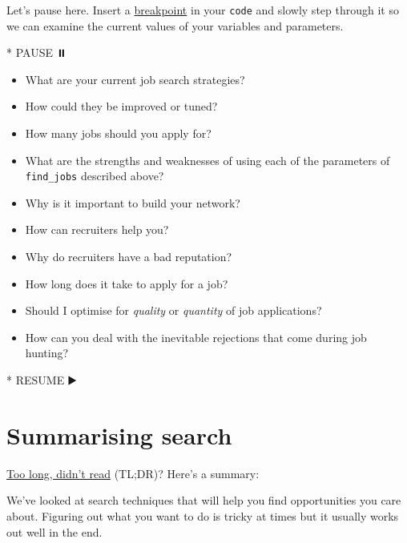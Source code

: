 \documentclass[
]{book}
\newenvironment{Shaded}{\begin{snugshade}}{\end{snugshade}}
\newcommand{\NormalTok}[1]{#1}
\newcommand{\SpecialStringTok}[1]{\textcolor[rgb]{0.31,0.60,0.02}{#1}}
\providecommand{\tightlist}{%
  \setlength{\itemsep}{0pt}\setlength{\parskip}{0pt}}
\begin{document}
Let's pause here. Insert a \href{https://en.wikipedia.org/wiki/Breakpoint}{breakpoint} in your \texttt{code} and slowly step through it so we can examine the current values of your variables and parameters.

\begin{Shaded}
\begin{Highlighting}[]
\SpecialStringTok{* }\NormalTok{PAUSE ⏸️}
\end{Highlighting}
\end{Shaded}

\begin{itemize}
\tightlist
\item
  What are your current job search strategies?
\item
  How could they be improved or tuned?
\item
  How many jobs should you apply for?\\
\item
  What are the strengths and weaknesses of using each of the parameters of \texttt{find\_jobs} described above?
\item
  Why is it important to build your network?
\item
  How can recruiters help you?
\item
  Why do recruiters have a bad reputation?
\item
  How long does it take to apply for a job?
\item
  Should I optimise for \emph{quality} or \emph{quantity} of job applications?
\item
  How can you deal with the inevitable rejections that come during job hunting?
\end{itemize}

\begin{Shaded}
\begin{Highlighting}[]
\SpecialStringTok{* }\NormalTok{RESUME ▶️}
\end{Highlighting}
\end{Shaded}

\hypertarget{tldr8}{%
\section{Summarising search}\label{tldr8}}

\href{https://en.wiktionary.org/wiki/too_long;_didn\%27t_read}{Too long, didn't read} (TL;DR)? Here's a summary:

We've looked at search techniques that will help you find opportunities you care about. Figuring out what you want to do is tricky at times but it usually works out well in the end.
\end{document}
